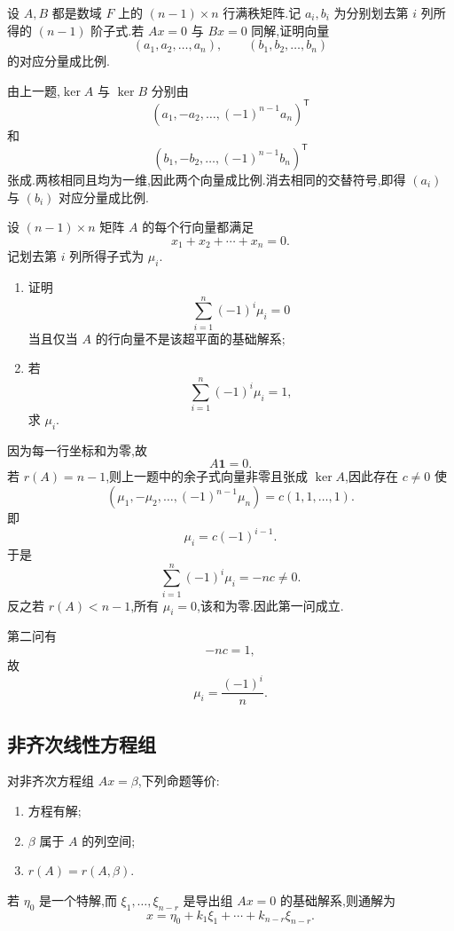 \begin{example}
设 $A,B$ 都是数域 $F$ 上的 $(n-1)\times n$ 行满秩矩阵.记 $a_i,b_i$ 为分别划去第 $i$ 列所得的 $(n-1)$ 阶子式.若 $Ax=0$ 与 $Bx=0$ 同解,证明向量
\[
(a_1,a_2,\ldots,a_n),
\qquad
(b_1,b_2,\ldots,b_n)
\]
的对应分量成比例.
\end{example}
\exampleblank

\begin{solution}
由上一题,$\ker A$ 与 $\ker B$ 分别由
\[
(a_1,-a_2,\ldots,(-1)^{n-1}a_n)^{\mathsf T}
\]
和
\[
(b_1,-b_2,\ldots,(-1)^{n-1}b_n)^{\mathsf T}
\]
张成.两核相同且均为一维,因此两个向量成比例.消去相同的交替符号,即得 $(a_i)$ 与 $(b_i)$ 对应分量成比例.
\end{solution}

\begin{example}
设 $(n-1)\times n$ 矩阵 $A$ 的每个行向量都满足
\[
x_1+x_2+\cdots+x_n=0.
\]
记划去第 $i$ 列所得子式为 $\mu_i$.
\begin{enumerate}
  \item 证明
  \[
  \displaystyle\sum\limits_{i=1}^n(-1)^i\mu_i=0
  \]
  当且仅当 $A$ 的行向量不是该超平面的基础解系;
  \item 若
  \[
  \displaystyle\sum\limits_{i=1}^n(-1)^i\mu_i=1,
  \]
  求 $\mu_i$.
\end{enumerate}
\end{example}
\exampleblank

\begin{solution}
因为每一行坐标和为零,故
\[
A\boldsymbol{1}=0.
\]
若 $r(A)=n-1$,则上一题中的余子式向量非零且张成 $\ker A$,因此存在 $c\neq0$ 使
\[
(\mu_1,-\mu_2,\ldots,(-1)^{n-1}\mu_n)=c(1,1,\ldots,1).
\]
即
\[
\mu_i=c(-1)^{i-1}.
\]
于是
\[
\displaystyle\sum_{i=1}^n(-1)^i\mu_i=-nc\neq0.
\]
反之若 $r(A)<n-1$,所有 $\mu_i=0$,该和为零.因此第一问成立.

第二问有
\[
-nc=1,
\]
故
\[
\boxed{\mu_i=\dfrac{(-1)^i}{n}}.
\]
\end{solution}

\subsection{非齐次线性方程组}

\begin{theorem}[\marktwostar]
对非齐次方程组 $Ax=\beta$,下列命题等价:
\begin{enumerate}
  \item 方程有解;
  \item $\beta$ 属于 $A$ 的列空间;
  \item $r(A)=r(A,\beta)$.
\end{enumerate}
若 $\eta_0$ 是一个特解,而 $\xi_1,\ldots,\xi_{n-r}$ 是导出组 $Ax=0$ 的基础解系,则通解为
\[
x=\eta_0+k_1\xi_1+\cdots+k_{n-r}\xi_{n-r}.
\]
\end{theorem}

